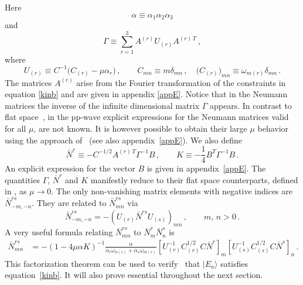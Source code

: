 \documentclass[12pt]{article}
\def\G{\Gamma}
\def\a{\alpha}
\def\d{\delta}
\def\m{\mu}
\def\o{\omega}
\def\ra{\rangle}
\numberwithin{equation}{section} \setlength{\textwidth}{17cm}
\begin{document}
Here 
\begin{equation}
\a\equiv\a_1\a_2\a_3
\end{equation}
and
\begin{equation}
\G\equiv\sum_{r=1}^3 A^{(r)}U_{(r)}A^{(r)\,T}\,,
\end{equation}
where
\begin{equation}
U_{(r)}\equiv C^{-1}\bigl(C_{(r)}-\m\a_r\bigr)\,,\qquad
C_{mn}\equiv m\d_{mn}\,,\quad
\bigl(C_{(r)}\bigr)_{mn}\equiv\o_{m(r)}\d_{mn}\,.
\end{equation}
The matrices $A^{(r)}$ arise from the Fourier transformation of the constraints in
equation \eqref{kinb} and are given in appendix \ref{appE}. Notice that in the Neumann
matrices the inverse of the infinite dimensional matrix $\G$ appears.
In contrast to flat space~\cite{Mand}, in the pp-wave explicit
expressions for the Neumann matrices valid for all $\m$, are not known. 
It is however possible to obtain their large $\m$ behavior using the approach of~\cite{sch} (see also 
appendix~\ref{appE}).
We also define
\begin{equation}
\bar{N}^r\equiv -C^{-1/2}A^{(r)\,T}\G^{-1}B\,,\qquad
K\equiv-\frac{1}{4}B^T\G^{-1}B\,.
\end{equation}
An explicit expression for the vector $B$ is given in appendix~\ref{appE}. The quantities
$\G$, $\bar{N}^r$ and $K$ manifestly reduce to their flat space counterparts,
defined in \cite{gs,gsb}, as $\m\to 0$.
The only non-vanishing matrix elements with negative indices are
$\bar{N}^{rs}_{-m,-n}$. They are related to $\bar{N}^{rs}_{mn}$ via \cite{sv}
\begin{equation}\label{neg}
\bar{N}^{rs}_{-m,-n}=-\left(U_{(r)}\bar{N}^{rs}U_{(s)}\right)_{mn}\,,\qquad m,\,n>0\,.
\end{equation}
A very useful formula relating
$\bar{N}^{rs}_{mn}$ to $\bar{N}^r_m\bar{N}^s_n$ is~\cite{sch,ap}
\begin{align}\label{nnpp}
\bar{N}^{rs}_{mn} & =-(1-4\m\a K)^{-1}\frac{\a}{\a_r\o_{n(s)}+\a_s\o_{m(r)}}
\left[U_{(r)}^{-1}C_{(r)}^{1/2}C\bar{N}^r\right]_m\left[U_{(s)}^{-1}C_{(s)}^{1/2}C\bar{N}^s\right]_n\,.
\end{align}
This factorization theorem can be used to verify~\cite{ap} that $|E_a\ra$ 
satisfies equation~\eqref{kinb}. It will also prove essential throughout the next section.
\end{document}
